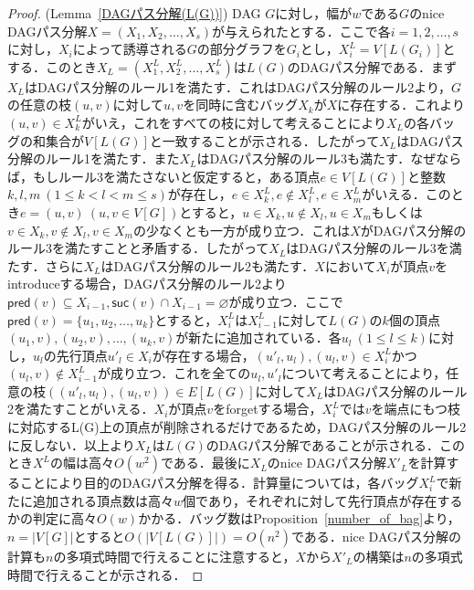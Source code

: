 \documentclass[master]{kuisthesis}		%
\theoremstyle{plain}
\theoremstyle{definition}
\begin{document}
{\begin{proof}(Lemma~\ref{DAGパス分解(L(G))})
    DAG $G$に対し，幅が$w$である$G$のnice DAGパス分解$X=(X_1, X_2, \dots, X_s)$が与えられたとする．ここで各$i=1, 2, \dots, s$に対し，$X_i$によって誘導される$G$の部分グラフを$G_i$とし，$X^L_i = V[L(G_i)]$とする．このとき$X_L=(X^L_1, X^L_2, \dots, X^L_s)$は$L(G)$のDAGパス分解である．まず$X_L$はDAGパス分解のルール1を満たす．これはDAGパス分解のルール2より，$G$の任意の枝$(u, v)$に対して$u, v$を同時に含むバッグ$X_k$が$X$に存在する．これより$(u, v)\in X^L_k$がいえ，これをすべての枝に対して考えることにより$X_L$の各バッグの和集合が$V[L(G)]$と一致することが示される．したがって$X_L$はDAGパス分解のルール1を満たす．また$X_L$はDAGパス分解のルール3も満たす．なぜならば，もしルール3を満たさないと仮定すると，ある頂点$e\in V[L(G)]$と整数$k, l, m\ (1 \leq k < l < m \leq s)$が存在し，$e\in X^L_k, e\notin X^L_l, e\in X^L_m$がいえる．このとき$e=(u, v)\ (u, v \in V[G])$とすると，$u\in X_k, u\notin X_l, u\in X_m$もしくは$v\in X_k, v\notin X_l, v\in X_m$の少なくとも一方が成り立つ．これは$X$がDAGパス分解のルール3を満たすことと矛盾する．したがって$X_L$はDAGパス分解のルール3を満たす．さらに$X_L$はDAGパス分解のルール2も満たす．$X$において$X_i$が頂点$v$をintroduceする場合，DAGパス分解のルール2より$\mathsf{pred}(v)\subseteq X_{i-1}, \mathsf{suc}(v)\cap X_{i-1} = \varnothing$が成り立つ．ここで$\mathsf{pred}(v)=\{u_1, u_2, \dots, u_k\}$とすると，$X^L_i$は$X^L_{i-1}$に対して$L(G)$の$k$個の頂点$(u_1, v), (u_2, v), \dots, (u_k, v)$が新たに追加されている．各$u_l\ (1\leq l \leq k)$に対し，$u_l$の先行頂点$u'_l \in X_i$が存在する場合，$(u'_l, u_l), (u_l, v) \in X^L_i$かつ$(u_l, v) \notin X^L_{i-1}$が成り立つ．これを全ての$u_l, u'_l$について考えることにより，任意の枝$((u'_l, u_l), (u_l, v)) \in E[L(G)]$に対して$X_L$はDAGパス分解のルール2を満たすことがいえる．$X_i$が頂点$v$をforgetする場合，$X^L_i$では$v$を端点にもつ枝に対応するL(G)上の頂点が削除されるだけであるため，DAGパス分解のルール2に反しない．以上より$X_L$は$L(G)$のDAGパス分解であることが示される．このとき$X^L$の幅は高々$O(w^2)$である．最後に$X_L$のnice DAGパス分解$X'_L$を計算することにより目的のDAGパス分解を得る．計算量については，各バッグ$X^L_i$で新たに追加される頂点数は高々$w$個であり，それぞれに対して先行頂点が存在するかの判定に高々$O(w)$かかる．バッグ数はProposition~\ref{number_of_bag}より，$n=|V[G]|$とすると$O(|V[L(G)]|)=O(n^2)$である．nice DAGパス分解の計算も$n$の多項式時間で行えることに注意すると，$X$から$X'_L$の構築は$n$の多項式時間で行えることが示される．
\end{proof}



}
\end{document}
